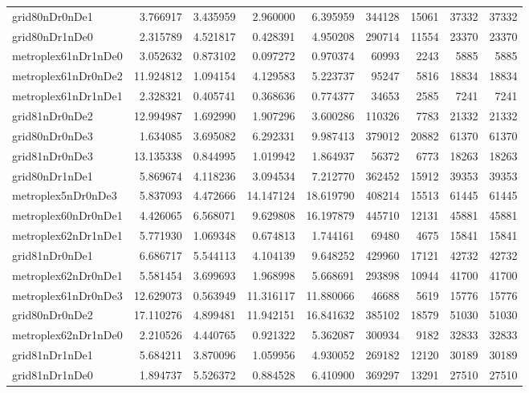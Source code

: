 \begin{longtable}{|l|r|r|r|r|r|r|r|r|}
grid80nDr0nDe1 & 3.766917 & 3.435959 & 2.960000 & 6.395959 & 344128 & 15061 & 37332 & 37332 \\
grid80nDr1nDe0 & 2.315789 & 4.521817 & 0.428391 & 4.950208 & 290714 & 11554 & 23370 & 23370 \\
metroplex61nDr1nDe0 & 3.052632 & 0.873102 & 0.097272 & 0.970374 & 60993 & 2243 & 5885 & 5885 \\
metroplex61nDr0nDe2 & 11.924812 & 1.094154 & 4.129583 & 5.223737 & 95247 & 5816 & 18834 & 18834 \\
metroplex61nDr1nDe1 & 2.328321 & 0.405741 & 0.368636 & 0.774377 & 34653 & 2585 & 7241 & 7241 \\
grid81nDr0nDe2 & 12.994987 & 1.692990 & 1.907296 & 3.600286 & 110326 & 7783 & 21332 & 21332 \\
grid80nDr0nDe3 & 1.634085 & 3.695082 & 6.292331 & 9.987413 & 379012 & 20882 & 61370 & 61370 \\
grid81nDr0nDe3 & 13.135338 & 0.844995 & 1.019942 & 1.864937 & 56372 & 6773 & 18263 & 18263 \\
grid80nDr1nDe1 & 5.869674 & 4.118236 & 3.094534 & 7.212770 & 362452 & 15912 & 39353 & 39353 \\
metroplex5nDr0nDe3 & 5.837093 & 4.472666 & 14.147124 & 18.619790 & 408214 & 15513 & 61445 & 61445 \\
metroplex60nDr0nDe1 & 4.426065 & 6.568071 & 9.629808 & 16.197879 & 445710 & 12131 & 45881 & 45881 \\
metroplex62nDr1nDe1 & 5.771930 & 1.069348 & 0.674813 & 1.744161 & 69480 & 4675 & 15841 & 15841 \\
grid81nDr0nDe1 & 6.686717 & 5.544113 & 4.104139 & 9.648252 & 429960 & 17121 & 42732 & 42732 \\
metroplex62nDr0nDe1 & 5.581454 & 3.699693 & 1.968998 & 5.668691 & 293898 & 10944 & 41700 & 41700 \\
metroplex61nDr0nDe3 & 12.629073 & 0.563949 & 11.316117 & 11.880066 & 46688 & 5619 & 15776 & 15776 \\
grid80nDr0nDe2 & 17.110276 & 4.899481 & 11.942151 & 16.841632 & 385102 & 18579 & 51030 & 51030 \\
metroplex62nDr1nDe0 & 2.210526 & 4.440765 & 0.921322 & 5.362087 & 300934 & 9182 & 32833 & 32833 \\
grid81nDr1nDe1 & 5.684211 & 3.870096 & 1.059956 & 4.930052 & 269182 & 12120 & 30189 & 30189 \\
grid81nDr1nDe0 & 1.894737 & 5.526372 & 0.884528 & 6.410900 & 369297 & 13291 & 27510 & 27510 \\

\end{longtable}
